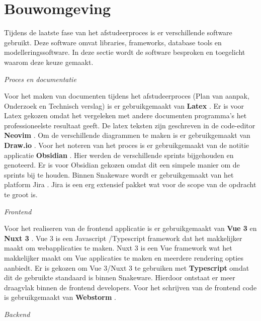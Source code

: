 \section{Bouwomgeving}
\label{section:Bouwomgeving}
Tijdens de laatste fase van het afstudeerproces is er verschillende software gebruikt.
Deze software omvat libraries, frameworks, database tools en modelleringssoftware.
In deze sectie wordt de software besproken en toegelicht waarom deze keuze gemaakt.

\whitespace[2]
\textit{Proces en documentatie}

\whitespace[2]
Voor het maken van documenten tijdens het afstudeerproces (Plan van aanpak, Onderzoek en Technisch verslag) is er gebruikgemaakt van \textbf{Latex} \parencite{Latex}.
Er is voor Latex gekozen omdat het vergeleken met andere documenten programma's het professioneelste resultaat geeft.
De latex teksten zijn geschreven in de code-editor \textbf{Neovim} \parencite{NeoVim}.
Om de verschillende diagrammen te maken is er gebruikgemaakt van \textbf{Draw.io} \parencite{Drawio}.
Voor het noteren van het proces is er gebruikgemaakt van de notitie applicatie \textbf{Obsidian} \parencite{Obsidian}.
Hier werden de verschillende sprints bijgehouden en genoteerd.
Er is voor Obsidian gekozen omdat dit een simpele manier om de sprints bij te houden.
Binnen Snakeware wordt er gebruikgemaakt van het platform Jira \parencite{Jira}.
Jira is een erg extensief pakket wat voor de scope van de opdracht te groot is.

\whitespace[2]
\textit{Frontend}

\whitespace[2]
Voor het realiseren van de frontend applicatie is er gebruikgemaakt van \textbf{Vue 3} \parencite{Vue} en \textbf{Nuxt 3} \parencite{Nuxt}.
Vue 3 is een Javascript \parencite{JavaScript}\slash Typescript \parencite{Typescript} framework dat het makkelijker maakt om webapplicaties te maken.
Nuxt 3 is een Vue framework wat het makkelijker maakt om Vue applicaties te maken en meerdere rendering opties aanbiedt.
Er is gekozen om Vue 3\slash Nuxt 3 te gebruiken met \textbf{Typescript} omdat dit de gebruikte standaard is binnen Snakeware.
Hierdoor ontstaat er meer draagvlak binnen de frontend developers.
Voor het schrijven van de frontend code is gebruikgemaakt van \textbf{Webstorm} \parencite{Webstorm}.

\newpage

\whitespace[2]
\textit{Backend}

